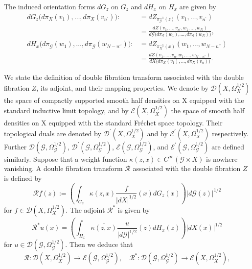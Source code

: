 \documentclass[a4paper,11pt,reqno]{amsart}
\theoremstyle{definition}
\theoremstyle{remark}
\begin{document}
%
%
The induced orientation forms $dG_z$ on $G_z$ and $dH_x$ on $H_x$ are given by 
%
%
\begin{align*}
  dG_z\bigl(d\pi_X(v_1),\dotsc,d\pi_X(v_{n^\prime})\bigr) :
& =
  dZ_{\pi_\mathcal{G}^{-1}(z)}(v_1,\dotsc,v_{n^\prime})
\\
& =
  \frac{dZ(v_1,\dotsc,v_{n^\prime},w_1,\dotsc,w_N)}{d\mathcal{G}\bigl(d\pi_\mathcal{G}(w_1),\dotsc,d\pi_\mathcal{G}(w_N)\bigr)},
\\ 
  dH_x\bigl(d\pi_\mathcal{G}(w_1),\dotsc,d\pi_\mathcal{G}(w_{N-n^{\prime\prime}})\bigr) :
& =
  dZ_{\pi_X^{-1}(x)}(w_1,\dotsc,w_{N-n^{\prime\prime}})
\\
& =
  \frac{dZ(v_1,\dotsc,v_n,w_1,\dotsc,w_{N-n^{\prime\prime}})}{dX\bigl(d\pi_X(v_1),\dotsc,d\pi_X(v_n)\bigr)}.
\end{align*}
%
%
\par
%
%
We state the definition of double fibration transform 
associated with the double fibration $Z$, 
its adjoint, and their mapping properties. 
We denote by $\mathscr{D}(X,\Omega_X^{1/2})$ 
the space of compactly supported smooth half densities 
on X equipped with the standard inductive limit topology, 
and by $\mathscr{E}(X,\Omega_X^{1/2})$ the space of smooth half densities 
on X equipped with the standard Fr\'echet space topology. 
Their topological duals are denoted by $\mathscr{D}^\prime(X,\Omega_X^{1/2})$ 
and by $\mathscr{E}^\prime(X,\Omega_X^{1/2})$ respectively. 
Further 
$\mathscr{D}(\mathcal{G},\Omega_\mathcal{G}^{1/2})$, 
$\mathscr{D}^\prime(\mathcal{G},\Omega_\mathcal{G}^{1/2})$, 
$\mathscr{E}(\mathcal{G},\Omega_\mathcal{G}^{1/2})$, 
and 
$\mathscr{E}^\prime(\mathcal{G},\Omega_\mathcal{G}^{1/2})$ 
are defined similarly. 
Suppose that a weight function $\kappa(z,x) \in C^\infty(\mathcal{G}{\times}X)$ is nowhere vanishing. 
A double fibration transform $\mathcal{R}$ associated with the double fibration $Z$ is defined by 
%
%
$$
\mathcal{R}f(z)
:=
\left(
\int_{G_z}
\kappa(z,x)
\frac{f}{\lvert{dX}\rvert^{1/2}}(x)
dG_z(x)
\right)
\lvert{d\mathcal{G}(z)}\rvert^{1/2}
$$
%
%
for $f \in \mathscr{D}(X,\Omega_X^{1/2})$. 
The adjoint $\mathcal{R}^\ast$ is given by 
%
%
$$
\mathcal{R}^\ast{u(x)}
=
\left(
\int_{H_x}
\overline{\kappa(z,x)}
\frac{u}{\lvert{d\mathcal{G}}\rvert^{1/2}}(z)
dH_x(z)
\right)
\lvert{dX(x)}\rvert^{1/2}
$$
%
%
for $u \in \mathscr{D}(\mathcal{G},\Omega_\mathcal{G}^{1/2})$. 
Then we deduce that 
%
%
$$
\mathcal{R}:\mathscr{D}(X,\Omega_X^{1/2}) \rightarrow \mathscr{E}(\mathcal{G},\Omega_\mathcal{G}^{1/2}), 
\quad
\mathcal{R}^\ast:\mathscr{D}(\mathcal{G},\Omega_\mathcal{G}^{1/2}) \rightarrow \mathscr{E}(X,\Omega_X^{1/2}), 
$$
\end{document}
